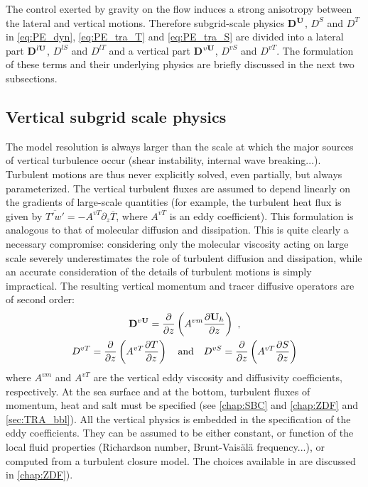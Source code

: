 \documentclass[../main/NEMO_manual]{subfiles}
\begin{document}
The control exerted by gravity on the flow induces a strong anisotropy between the lateral and vertical motions.
Therefore subgrid-scale physics \textbf{D}$^{\mathbf{U}}$, $D^{S}$ and $D^{T}$  in
\autoref{eq:PE_dyn}, \autoref{eq:PE_tra_T} and \autoref{eq:PE_tra_S} are divided into
a lateral part \textbf{D}$^{l \mathbf{U}}$, $D^{l S}$ and $D^{l T}$ and
a vertical part \textbf{D}$^{v \mathbf{U}}$, $D^{v S}$ and $D^{v T}$.
The formulation of these terms and their underlying physics are briefly discussed in the next two subsections.

\subsection{Vertical subgrid scale physics}
\label{subsec:PE_zdf}

The model resolution is always larger than the scale at which the major sources of vertical turbulence occur
(shear instability, internal wave breaking...).
Turbulent motions are thus never explicitly solved, even partially, but always parameterized.
The vertical turbulent fluxes are assumed to depend linearly on the gradients of large-scale quantities
(for example, the turbulent heat flux is given by $\overline{T' w'} = -A^{v T} \partial_z \overline T$,
where $A^{v T}$ is an eddy coefficient).
This formulation is analogous to that of molecular diffusion and dissipation.
This is quite clearly a necessary compromise: considering only the molecular viscosity acting on
large scale severely underestimates the role of turbulent diffusion and dissipation,
while an accurate consideration of the details of turbulent motions is simply impractical.
The resulting vertical momentum and tracer diffusive operators are of second order:
\begin{equation}
  \label{eq:PE_zdf}
  \begin{gathered}
    \vect D^{v \vect U} = \pd[]{z} \lt( A^{vm} \pd[\vect U_h]{z} \rt) \ , \\
          D^{vT}       = \pd[]{z} \lt( A^{vT} \pd[T]{z}         \rt) \quad \text{and} \quad
          D^{vS}       = \pd[]{z} \lt( A^{vT} \pd[S]{z}         \rt)
  \end{gathered}
\end{equation}
where $A^{vm}$ and $A^{vT}$ are the vertical eddy viscosity and diffusivity coefficients, respectively.
At the sea surface and at the bottom, turbulent fluxes of momentum, heat and salt must be specified
(see \autoref{chap:SBC} and \autoref{chap:ZDF} and \autoref{sec:TRA_bbl}).
All the vertical physics is embedded in the specification of the eddy coefficients.
They can be assumed to be either constant, or function of the local fluid properties
(\eg Richardson number, Brunt-Vais\"{a}l\"{a} frequency...),
or computed from a turbulent closure model.
The choices available in \NEMO are discussed in \autoref{chap:ZDF}).
\end{document}
